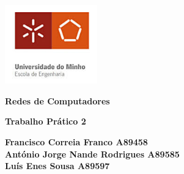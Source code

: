 \documentclass[11pt]{article}
\begin{document}
\begin{titlepage}
    \begin{center}
        \includegraphics[width=0.3\textwidth]{images/capa/EscolaEngenhariaUM.jpeg}
    
        \vspace{1cm}
        
        \textbf{\LARGE Redes de Computadores}
    
        \vspace{0.5cm}
        \textbf{\Large Trabalho Prático 2}

        \vspace{1.3cm}
        
        \textbf{\large Francisco Correia Franco A89458 \\
        António Jorge Nande Rodrigues A89585 \\
        Luís Enes Sousa A89597}

        \vspace{1.5cm}
    

\end{center}
\end{titlepage}
\end{document}
